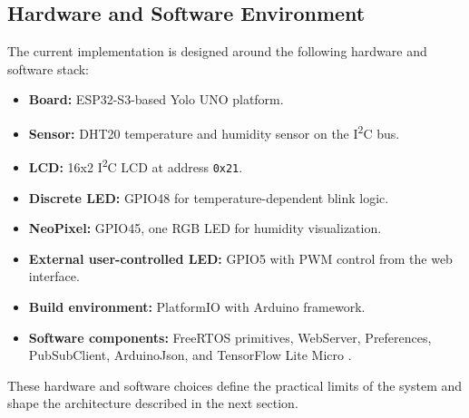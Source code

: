 \subsection{Hardware and Software Environment}
The current implementation is designed around the following hardware and
software stack:
\begin{itemize}
  \item \textbf{Board:} ESP32-S3-based Yolo UNO platform.
  \item \textbf{Sensor:} DHT20 temperature and humidity sensor on the
  I\textsuperscript{2}C bus.
  \item \textbf{LCD:} 16x2 I\textsuperscript{2}C LCD at address
  \texttt{0x21}.
  \item \textbf{Discrete LED:} GPIO48 for temperature-dependent blink logic.
  \item \textbf{NeoPixel:} GPIO45, one RGB LED for humidity visualization.
  \item \textbf{External user-controlled LED:} GPIO5 with PWM control from the
  web interface.
  \item \textbf{Build environment:} PlatformIO with Arduino framework.
  \item \textbf{Software components:} FreeRTOS primitives, WebServer,
  Preferences, PubSubClient, ArduinoJson, and TensorFlow Lite Micro
  \cite{platformio,freertos_kernel,pubsubclient,arduinojson,tflm}.
\end{itemize}

These hardware and software choices define the practical limits of the system
and shape the architecture described in the next section.
